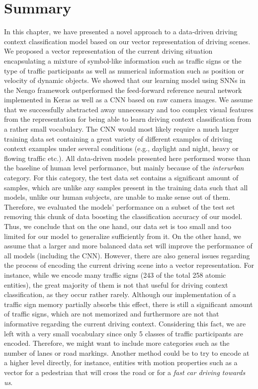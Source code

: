\section{Summary}%
\label{sec:summary_context_classification}

In this chapter, we have presented a novel approach to a data-driven driving context classification model based on our vector representation of driving scenes.
We proposed a vector representation of the current driving situation encapsulating a mixture of symbol-like information such as traffic signs or the type of traffic participants as well as numerical information such as position or velocity of dynamic objects.
We showed that our learning model using \acp{SNN} in the \ac{Nengo} framework outperformed the feed-forward reference neural network implemented in Keras as well as a \ac{CNN} based on raw camera images.
We assume that we successfully abstracted away unnecessary and too complex visual features from the representation for being able to learn driving context classification from a rather small vocabulary.
The \ac{CNN} would most likely require a much larger training data set containing a great variety of different examples of driving context examples under several conditions (e.g., daylight and night, heavy or flowing traffic etc.).
All data-driven models presented here performed worse than the baseline of human level performance, but mainly because of the \emph{interurban} category.
For this category, the test data set contains a significant amount of samples, which are unlike any samples present in the training data such that all models, unlike our human subjects, are unable to make sense out of them.
Therefore, we evaluated the models' performance on a subset of the test set removing this chunk of data boosting the classification accuracy of our model.
Thus, we conclude that on the one hand, our data set is too small and too limited for our model to generalize sufficiently from it.
On the other hand, we assume that a larger and more balanced data set will improve the performance of all models (including the \ac{CNN}). 
However, there are also general issues regarding the process of encoding the current driving scene into a vector representation.
For instance, while we encode many traffic signs (\num{243} of the total \num{258} atomic entities), the great majority of them is not that useful for driving context classification, as they occur rather rarely.
Although our implementation of a traffic sign memory partially absorbs this effect, there is still a significant amount of traffic signs, which are not memorized and furthermore are not that informative regarding the current driving context.
Considering this fact, we are left with a very small vocabulary since only \num{5} classes of traffic participants are encoded.
Therefore, we might want to include more categories such as the number of lanes or road markings.
Another method could be to try to encode at a higher level directly, for instance, entities with motion properties such as a vector for a pedestrian that will cross the road or for a \emph{fast car driving towards us}.

